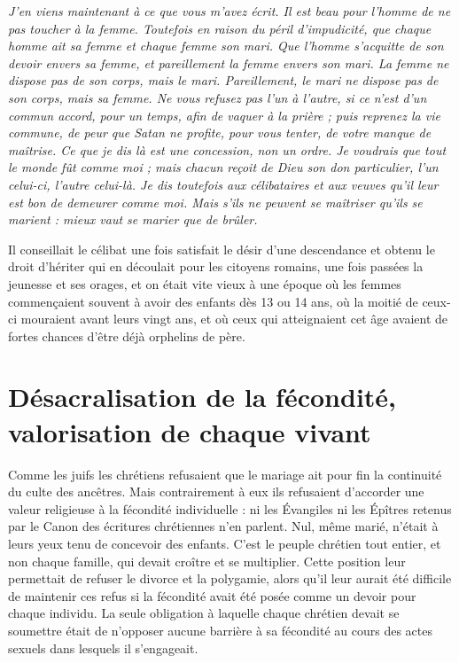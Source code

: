 \begin{displayquote}[I Cor 7, 8-9]
\emph{J'en viens maintenant à ce que vous m'avez écrit. Il est beau pour l'homme de ne pas toucher à la femme. Toutefois en raison du péril d'impudicité, que chaque homme ait sa femme et chaque femme son mari. Que l'homme s'acquitte de son devoir envers sa femme, et pareillement la femme envers son mari. La femme ne dispose pas de son corps, mais le mari. Pareillement, le mari ne dispose pas de son corps, mais sa femme. Ne vous refusez pas l'un à l'autre, si ce n'est d'un commun accord, pour un temps, afin de vaquer à la prière ; puis reprenez la vie commune, de peur que Satan ne profite, pour vous tenter, de votre manque de maîtrise. Ce que je dis là est une concession, non un ordre. Je voudrais que tout le monde fût comme moi ; mais chacun reçoit de Dieu son don particulier, l'un celui-ci, l'autre celui-là. Je dis toutefois aux célibataires et aux veuves qu'il leur est bon de demeurer comme moi. Mais s'ils ne peuvent se maîtriser qu'ils se marient : mieux vaut se marier que de brûler.}
\end{displayquote}

 Il conseillait le célibat une fois satisfait le désir d'une descendance et obtenu le droit d'hériter qui en découlait pour les citoyens romains, une fois passées la jeunesse et ses orages, et on était vite vieux à une époque où les femmes commençaient souvent à avoir des enfants dès 13 ou 14 ans, où la moitié de ceux-ci mouraient avant leurs vingt ans, et où ceux qui atteignaient cet âge avaient de fortes chances d'être déjà orphelins de père. 


\section{Désacralisation de la fécondité, valorisation de chaque vivant}

 Comme les juifs les chrétiens refusaient que le mariage ait pour fin la continuité du culte des ancêtres. Mais contrairement à eux ils refusaient d'accorder une valeur religieuse à la fécondité individuelle : ni les Évangiles ni les Épîtres retenus par le Canon des écritures chrétiennes n'en parlent. Nul, même marié, n'était à leurs yeux tenu de concevoir des enfants. C'est le peuple chrétien tout entier, et non chaque famille, qui devait croître et se multiplier. Cette position leur permettait de refuser le divorce et la polygamie, alors qu'il leur aurait été difficile de maintenir ces refus si la fécondité avait été posée comme un devoir pour chaque individu. La seule obligation à laquelle chaque chrétien devait se soumettre était de n'opposer aucune barrière à sa fécondité au cours des actes sexuels dans lesquels il s'engageait. 

